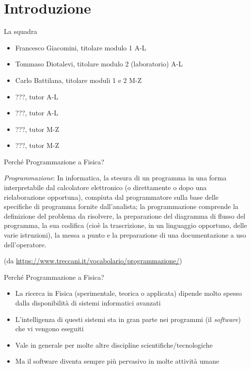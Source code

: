 
\section*{Introduzione}

\begin{frame}{La squadra}

  \begin{itemize}
  \item Francesco Giacomini, titolare modulo 1 A-L
  \item Tommaso Diotalevi, titolare modulo 2 (laboratorio) A-L
  \item Carlo Battilana, titolare moduli 1 e 2 M-Z
  \item ???, tutor A-L
  \item ???, tutor A-L
  \item ???, tutor M-Z
  \item ???, tutor M-Z
  \end{itemize}

\end{frame}

\begin{frame}{Perché Programmazione a Fisica?}

  \textit{Programmazione}: In informatica, la stesura di un programma in una
  forma interpretabile dal calcolatore elettronico (o direttamente o dopo una
  rielaborazione opportuna), compiuta dal programmatore sulla base delle
  specifiche di programma fornite dall'analista; la programmazione comprende la
  definizione del problema da risolvere, la preparazione del diagramma di flusso
  del programma, la sua codifica (cioè la trascrizione, in un linguaggio
  opportuno, delle varie istruzioni), la messa a punto e la preparazione di una
  documentazione a uso dell'operatore.

  {\tiny (da \url{https://www.treccani.it/vocabolario/programmazione/})}

\end{frame}

\begin{frame}{Perché Programmazione a Fisica? \insertcontinuationtext}

  \begin{itemize}[<+->]
  \item La ricerca in Fisica (sperimentale, teorica o applicata) dipende
    molto spesso dalla disponibilità di sistemi informatici avanzati
  \item L'intelligenza di questi sistemi sta in gran parte nei programmi (il
    \textit{software}) che vi vengono eseguiti
  \item Vale in generale per molte altre discipline scientifiche/tecnologiche
  \item Ma il software diventa sempre più pervasivo in molte attività umane
  \end{itemize}

\end{frame}

